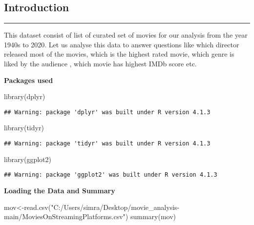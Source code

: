 \documentclass[
]{article}
\newenvironment{Shaded}{\begin{snugshade}}{\end{snugshade}}
\newcommand{\FunctionTok}[1]{\textcolor[rgb]{0.00,0.00,0.00}{#1}}
\newcommand{\NormalTok}[1]{#1}
\newcommand{\OtherTok}[1]{\textcolor[rgb]{0.56,0.35,0.01}{#1}}
\newcommand{\StringTok}[1]{\textcolor[rgb]{0.31,0.60,0.02}{#1}}
\begin{document}
\hypertarget{intro}{%
\subsection{\texorpdfstring{\textbf{Introduction}}{Introduction}}\label{intro}}

\begin{center}\rule{0.5\linewidth}{0.5pt}\end{center}

This dataset consist of list of curated set of movies for our analysis
from the year 1940s to 2020. Let us analyse this data to answer
questions like which director released most of the movies, which is the
highest rated movie, which genre is liked by the audience , which movie
has highest IMDb score etc.

\textbf{Packages used}

\begin{Shaded}
\begin{Highlighting}[]
\FunctionTok{library}\NormalTok{(dplyr)}
\end{Highlighting}
\end{Shaded}

\begin{verbatim}
## Warning: package 'dplyr' was built under R version 4.1.3
\end{verbatim}

\begin{Shaded}
\begin{Highlighting}[]
\FunctionTok{library}\NormalTok{(tidyr)}
\end{Highlighting}
\end{Shaded}

\begin{verbatim}
## Warning: package 'tidyr' was built under R version 4.1.3
\end{verbatim}

\begin{Shaded}
\begin{Highlighting}[]
\FunctionTok{library}\NormalTok{(ggplot2)}
\end{Highlighting}
\end{Shaded}

\begin{verbatim}
## Warning: package 'ggplot2' was built under R version 4.1.3
\end{verbatim}

\textbf{Loading the Data and Summary }

\begin{Shaded}
\begin{Highlighting}[]
\NormalTok{mov}\OtherTok{\textless{}{-}}\FunctionTok{read.csv}\NormalTok{(}\StringTok{"C:/Users/simra/Desktop/movie\_analysis{-}main/MoviesOnStreamingPlatforms.csv"}\NormalTok{)}
\FunctionTok{summary}\NormalTok{(mov)}
\end{Highlighting}
\end{Shaded}
\end{document}
